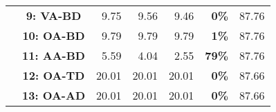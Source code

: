 \begin{table*}[!ht]
\begin{tabular}{c|c|rrrr|r}
    \cline{2-7}
    & \raggedright\textbf{\textcolor{orange!70}{\phantom{*}9: VA-BD}} & 9.75 & 9.56 & 9.46 & \textcolor{t0!100}{\textbf{0\%}} & 87.76 \\
    & \raggedright\textbf{\textcolor{purple!70}{10: OA-BD}} & 9.79 & 9.79 & 9.79 & \textcolor{t1!100}{\textbf{1\%}} & 87.76 \\
    & \raggedright\textbf{\textcolor{purple!70}{11: AA-BD}} & 5.59 & 4.04 & 2.55 & \textcolor{t79!100}{\textbf{79\%}} & 87.76 \\
    & \raggedright\textbf{\textcolor{teal!70}{12: OA-TD}} & 20.01 & 20.01 & 20.01 & \textcolor{t0!100}{\textbf{0\%}} & 87.66 \\
    & \raggedright\textbf{\textcolor{teal!70}{13: OA-AD}} & 20.01 & 20.01 & 20.01 & \textcolor{t0!100}{\textbf{0\%}} & 87.66 \\
    \bottomrule
  \end{tabular}
  \label{tab:BAGS_result}
\end{table*}

